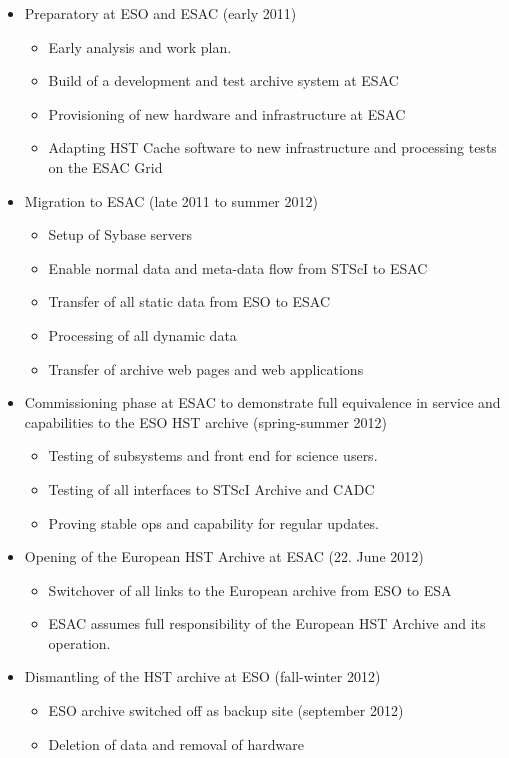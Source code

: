 \begin{itemize} \itemsep0pt \parskip0pt 
\item Preparatory at ESO and ESAC (early 2011) 
 \begin{itemize} \itemsep0pt \parskip0pt 
  \item Early analysis and work plan.
  \item Build of a development and test archive system at ESAC
  \item Provisioning of new hardware and infrastructure at ESAC
  \item Adapting HST Cache software  to new infrastructure and processing tests on the ESAC Grid  
  \end{itemize}
\item Migration to ESAC (late 2011 to  summer 2012)
  \begin{itemize} \itemsep0pt \parskip0pt 
  \item Setup of Sybase servers  
   \item Enable normal data and meta-data flow from STScI to ESAC
  \item Transfer of all static data from ESO to ESAC
  \item Processing of all dynamic data
  \item Transfer of archive web pages and web applications
  \end{itemize}
\item Commissioning phase at ESAC to demonstrate full equivalence in service and capabilities to the ESO HST archive (spring-summer 2012)
\begin{itemize} \itemsep0pt \parskip0pt 
\item Testing of subsystems and front end for science users. 
\item	Testing of all interfaces to STScI Archive and CADC
\item	Proving stable ops and capability for regular updates.
\end{itemize} \itemsep0pt \parskip0pt  
\item Opening of the European HST Archive at ESAC  (22. June 2012)
\begin{itemize}
\item Switchover of all links to the European archive from ESO to ESA
\item ESAC assumes full responsibility of the European HST Archive and its operation.
\end{itemize} \itemsep0pt \parskip0pt 
\item Dismantling of the HST archive at ESO (fall-winter 2012)
\begin{itemize} \itemsep0pt \parskip0pt 
\item ESO archive switched off as backup site (september 2012) 
\item Deletion of data and removal of hardware
\end{itemize}
\end{itemize}



